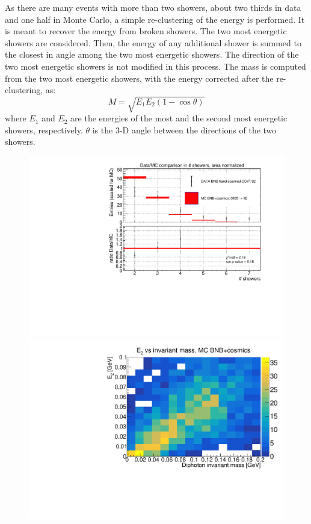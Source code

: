 As there are many events with more than two showers, about two thirds in data and one half in Monte Carlo, a simple re-clustering of the energy is performed. It is meant to recover the energy from broken showers. The two most energetic showers are considered. Then, the energy of any additional shower is summed to the closest in angle among the two most energetic showers. The direction of the two most energetic showers is not modified in this process. The mass is computed from the two most energetic showers, with the energy corrected after the re-clustering, as:
\[ M = \sqrt{E_1 E_2 (1 - \cos\theta)} \]\textbf{}
where $E_1$ and $E_2$ are the energies of the most and the second most energetic showers, respectively. $\theta$ is the 3-D angle between the directions of the two showers.

\begin{figure}[!htbp]
\centering
\begin{minipage}{0.49\columnwidth}
  \includegraphics[width=0.99\columnwidth]{_fig/n_showers_data_MC_comparison.pdf}
\end{minipage}
\begin{minipage}{0.49\columnwidth} 
  \includegraphics[width=0.99\columnwidth]{_fig/MC_mass_E2.pdf}

\end{minipage}
\end{figure}

